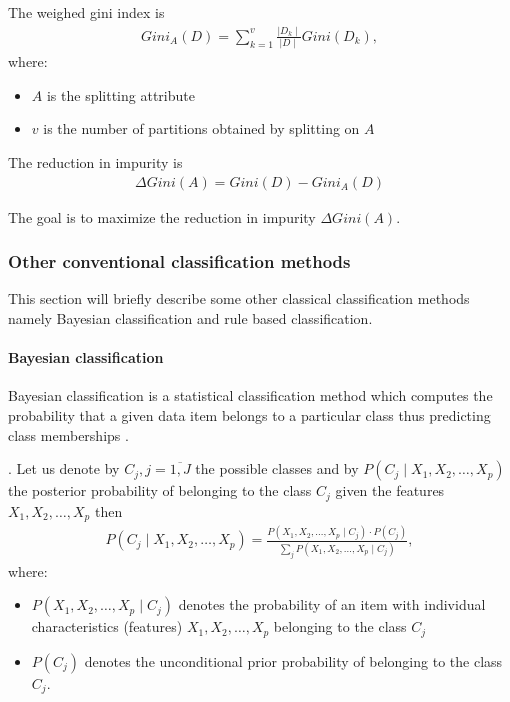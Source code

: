\begin{definition}
The weighed gini index is
\begin{align}
Gini_{A}(D)= \sum_{k=1}^{v} \frac{\mid D_{k} \mid}{\mid D \mid} Gini(D_{k}),
\end{align}
where:
\begin{itemize}
\item $A$ is the splitting attribute
\item $v$ is the number of partitions obtained by splitting on $A$
\end{itemize}
\end{definition}

\begin{definition}
The reduction in impurity is
\begin{align}
\Delta Gini(A)=Gini(D)- Gini_{A}(D)
\end{align}
\end{definition}

\begin{remark}
The goal is to maximize the reduction in impurity $\Delta Gini(A)$.
\end{remark}

\subsubsection{Other conventional classification methods}
This section will briefly describe some other classical classification methods namely Bayesian classification and rule based classification.

\paragraph{Bayesian classification}

Bayesian classification is a statistical classification method which computes the probability that a given data item belongs to a particular class thus predicting class memberships \cite{Ben08Encyclopedia}.

\begin{theorem}. Let us denote by $C_j , j=\overline{1,J}$ the possible classes and by $P(C_{j} \mid X_{1},X_{2}, \dots , X_{p})$
the posterior probability of belonging to the  class $C_j$ given the features $X_{1} , X_{2} , \dots , X_{p}$ then
\begin{align*}
P(C_{j} \mid X_{1},X_{2}, \dots , X_{p}) = \frac{P( X_{1} , X_{2} , \dots, X_{p} \mid C_{j} ) \cdot P(C_{j})
}{\sum_{j}P( X_{1} , X_{2} , \dots, X_{p} \mid C_{j})},
\end{align*}
where:
\begin{itemize}
\item $P( X_{1} , X_{2} , \dots, X_{p} \mid C_{j} )$ denotes the probability of an item with individual characteristics (features) $X_{1} , X_{2} , \dots , X_{p}$ belonging to the class $C_j$ 
\item  $P(C_{j} )$ denotes the unconditional prior probability of belonging to the class $C_j$.
\end{itemize}
\end{theorem}

